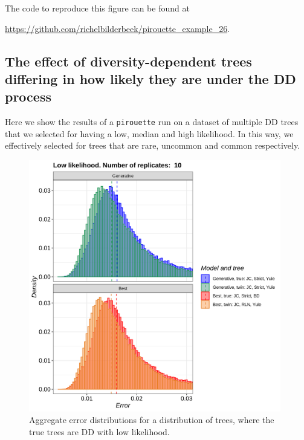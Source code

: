 
The code to reproduce this figure can be found at
\begin{sloppypar}
  \url{https://github.com/richelbilderbeek/pirouette_example_26}.
\end{sloppypar}

\newpage

\subsection{The effect of diversity-dependent trees differing in how likely they are under the DD process}
\label{subsec:better_label_needed}

Here we show the results of a \verb;pirouette; run on a dataset 
of multiple DD trees that we selected for having a low, median
and high likelihood. In this way, we effectively selected for trees
that are rare, uncommon and common respectively.

\begin{figure}[H]
  \includegraphics[width=0.98\textwidth]{pirouette_example_23/errors_low.png}
  \caption{Aggregate error distributions for a distribution of trees, where the true trees are DD with low likelihood.}
\end{figure}

